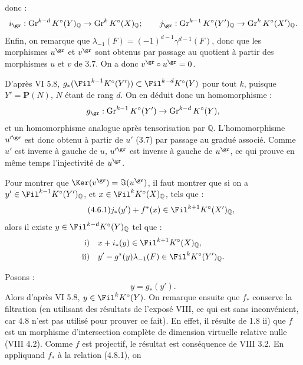 donc :
\[
  i_{\gr}:\operatorname{Gr}^{k-d}K^\circ(Y)_{\mathbb Q}
  \to \operatorname{Gr}^{k}K^\circ(X)_{\mathbb Q};
  \qquad
  j_{\gr}:\operatorname{Gr}^{k-1}K^\circ(Y')_{\mathbb Q}
  \to \operatorname{Gr}^{k}K^\circ(X')_{\mathbb Q}.
\]
Enfin, on remarque que \(\lambda_{-1}(F)=(-1)^{d-1}\gamma^{d-1}(F)\), donc que les morphismes \(u^{\gr}\) et \(v^{\gr}\) sont obtenus par passage au quotient à partir des morphismes \(u\) et \(v\) de 3.7. On a donc \(v^{\gr}\circ u^{\gr}=0\).

D'après VI 5.8, \(g_*(\Fil^{k-1}K^\circ(Y'))\subset \Fil^{k-d}K^\circ(Y)\) pour tout \(k\), puisque \(Y'=\mathbf P(N)\), \(N\) étant de rang \(d\). On en déduit donc un homomorphisme :
\[
  g_{\gr}:\operatorname{Gr}^{k-1}K^\circ(Y')
  \to\operatorname{Gr}^{k-d}K^\circ(Y),
\]
et un homomorphisme analogue après tensorisation par \(\mathbb Q\). L'homomorphisme \(u'^{\gr}\) est donc obtenu à partir de \(u'\) (3.7) par passage au gradué associé. Comme \(u'\) est inverse à gauche de \(u\), \(u'^{\gr}\) est inverse à gauche de \(u^{\gr}\), ce qui prouve en même temps l'injectivité de \(u^{\gr}\).

Pour montrer que \(\Ker(v^{\gr})=\Im(u^{\gr})\), il faut montrer que si on a \(y'\in\Fil^{k-1}K^\circ(Y')_{\mathbb Q}\), et \(x\in\Fil^kK^\circ(X)_{\mathbb Q}\), tels que :
\begin{equation}\tag{4.6.1}
  j_*(y')+f^*(x)\in\Fil^{k+1}K^\circ(X')_{\mathbb Q},
\end{equation}
alors il existe \(y\in\Fil^{k-d}K^\circ(Y)_{\mathbb Q}\) tel que :
\[
\begin{aligned}
\text{i)}\quad &x+i_*(y)\in\Fil^{k+1}K^\circ(X)_{\mathbb Q},\\
\text{ii)}\quad &y'-g^*(y)\lambda_{-1}(F)\in\Fil^{k}K^\circ(Y')_{\mathbb Q}.
\end{aligned}
\]

Posons :
\[
  y=g_*(y').
\]
Alors d'après VI 5.8, \(y\in\Fil^{k}K^\circ(Y)\). On remarque ensuite que \(f_*\) conserve la filtration (en utilisant des résultats de l'exposé VIII, ce qui est sans inconvénient, car 4.8 n'est pas utilisé pour prouver ce fait). En effet, il résulte de 1.8 ii) que \(f\) est un morphisme d'intersection complète de dimension virtuelle relative nulle (VIII 4.2). Comme \(f\) est projectif, le résultat est conséquence de VIII 3.2. En appliquand \(f_*\) à la relation (4.8.1), on
